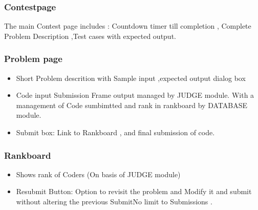 \subsubsection{Contestpage}
The main Contest page includes : Countdown timer till completion , Complete Problem Description ,Test cases with expected output. 

\subsubsection{Problem page}
\begin{itemize}
\item Short Problem descrition with Sample input ,expected output dialog box
\item Code input Submission Frame output managed by JUDGE module. With a management of
Code sumbimtted and rank in rankboard by DATABASE module.
\item Submit box: Link to Rankboard , and final submission of code.
\end{itemize}

\subsubsection{Rankboard}
\begin{itemize}
\item Shows rank of Coders (On basis of JUDGE module)
\item Resubmit Button: Option to revisit the problem and Modify it and submit without altering the previous Submit{No limit to Submissions }.
\end{itemize}

